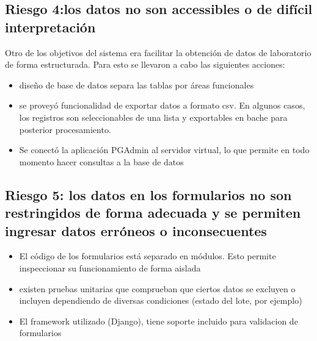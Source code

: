 \documentclass[letterpaper,10pt,spanish]{sphinxmanual}
\begin{document}
\subsection{Riesgo 4:los datos no son accessibles o de difícil interpretación}
\label{\detokenize{requerimientos/resumen_validacion:riesgo-4-los-datos-no-son-accessibles-o-de-dificil-interpretacion}}
Otro de los objetivos del sistema era facilitar la obtención de datos de laboratorio de forma estructurada.
Para esto se llevaron a cabo las siguientes acciones:
\begin{itemize}
\item {} 
diseño de base de datos separa las tablas por áreas funcionales

\item {} 
se proveyó funcionalidad de exportar datos a formato csv. En algunos casos, los registros son seleccionables de una lista y exportables en bache para posterior procesamiento.

\item {} 
Se conectó la aplicación PGAdmin al servidor virtual, lo que permite en todo momento hacer consultas a la base de datos

\end{itemize}


\subsection{Riesgo 5:  los datos en los formularios no son restringidos de forma adecuada y se permiten ingresar datos erróneos o inconsecuentes}
\label{\detokenize{requerimientos/resumen_validacion:riesgo-5-los-datos-en-los-formularios-no-son-restringidos-de-forma-adecuada-y-se-permiten-ingresar-datos-erroneos-o-inconsecuentes}}\begin{itemize}
\item {} 
El código de los formularios está separado en módulos. Esto permite inspeccionar su funcionamiento de forma aislada

\item {} 
existen pruebas unitarias que comprueban que ciertos datos se excluyen o incluyen dependiendo de diversas condiciones (estado del lote, por ejemplo)

\item {} 
El framework utilizado (Django), tiene soporte incluido para validacion de formularios

\end{itemize}
\end{document}
